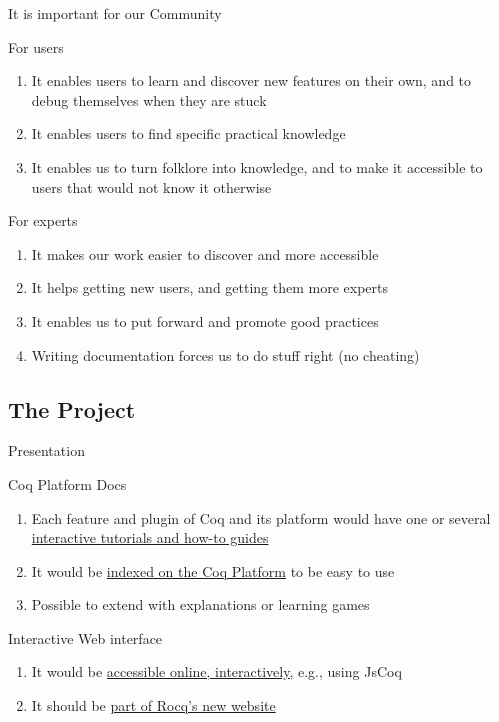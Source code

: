 \documentclass[10pt]{beamer}
\begin{document}
\begin{frame}{It is important for our Community}
\begin{tcbProp}{For users}
  \begin{enumerate}
    \item It enables users to learn and discover new features on their own,
          and to debug themselves when they are stuck
    \item<2-> It enables users to find specific practical knowledge
    \item<3-> It enables us to turn folklore into knowledge, and to make it
          accessible to users that would not know it otherwise
  \end{enumerate}
\end{tcbProp}
\begin{tcbProp}{For experts}
  \begin{enumerate}
    \item<4-> It makes our work easier to discover and more accessible
    \item<5-> It helps getting new users, and getting them more experts
    \item<6-> It enables us to put forward and promote good practices
    \item<7-> Writing documentation forces us to do stuff right (no cheating)
  \end{enumerate}
\end{tcbProp}
\end{frame}

\subsection{The Project}

\begin{frame}{Presentation}
  \begin{tcbObj}{Coq Platform Docs}
    \begin{enumerate}
      \item<1-> Each feature and plugin of Coq and its platform would have one
            or several \ul{interactive tutorials and how-to guides}
      \item<2-> It would be \ul{indexed on the Coq Platform} to be easy to use
      \item<3-> Possible to extend with explanations or learning games
    \end{enumerate}
  \end{tcbObj}
  \begin{tcbObj}{Interactive Web interface}
    \begin{enumerate}
      \item<4-> It would be \ul{accessible online, interactively,} e.g., using JsCoq
      \item<5-> It should be \ul{part of Rocq's new website}
    \end{enumerate}
  \end{tcbObj}
\end{frame}
\end{document}
